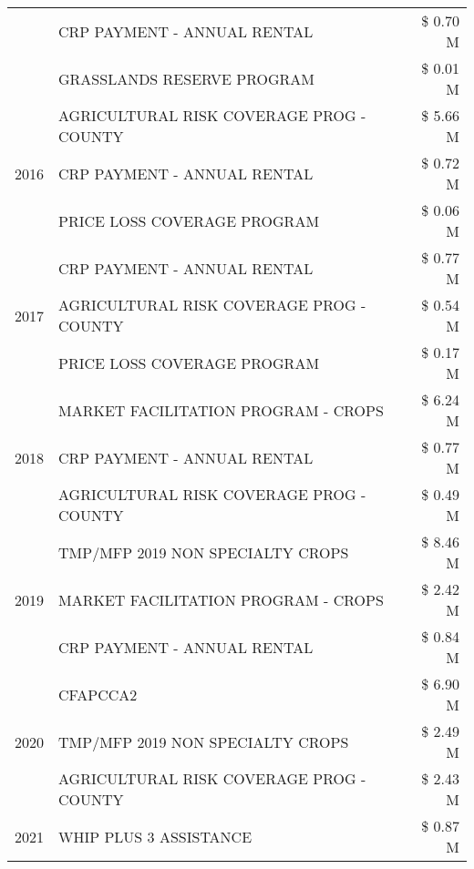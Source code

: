 \begin{tabular}{llr}
 & CRP PAYMENT - ANNUAL RENTAL & \$ 0.70 M \\
 & GRASSLANDS RESERVE PROGRAM & \$ 0.01 M \\
\cline{1-3}
\multirow[t]{3}{*}{2016} & AGRICULTURAL RISK COVERAGE PROG - COUNTY & \$ 5.66 M \\
 & CRP PAYMENT - ANNUAL RENTAL & \$ 0.72 M \\
 & PRICE LOSS COVERAGE PROGRAM & \$ 0.06 M \\
\cline{1-3}
\multirow[t]{3}{*}{2017} & CRP PAYMENT - ANNUAL RENTAL & \$ 0.77 M \\
 & AGRICULTURAL RISK COVERAGE PROG - COUNTY & \$ 0.54 M \\
 & PRICE LOSS COVERAGE PROGRAM & \$ 0.17 M \\
\cline{1-3}
\multirow[t]{3}{*}{2018} & MARKET FACILITATION PROGRAM - CROPS & \$ 6.24 M \\
 & CRP PAYMENT - ANNUAL RENTAL & \$ 0.77 M \\
 & AGRICULTURAL RISK COVERAGE PROG - COUNTY & \$ 0.49 M \\
\cline{1-3}
\multirow[t]{3}{*}{2019} & TMP/MFP 2019 NON SPECIALTY CROPS & \$ 8.46 M \\
 & MARKET FACILITATION PROGRAM - CROPS & \$ 2.42 M \\
 & CRP PAYMENT - ANNUAL RENTAL & \$ 0.84 M \\
\cline{1-3}
\multirow[t]{3}{*}{2020} & CFAPCCA2 & \$ 6.90 M \\
 & TMP/MFP 2019 NON SPECIALTY CROPS & \$ 2.49 M \\
 & AGRICULTURAL RISK COVERAGE PROG - COUNTY & \$ 2.43 M \\
\cline{1-3}
2021 & WHIP PLUS 3 ASSISTANCE & \$ 0.87 M \\
\cline{1-3}
\bottomrule
\end{tabular}
